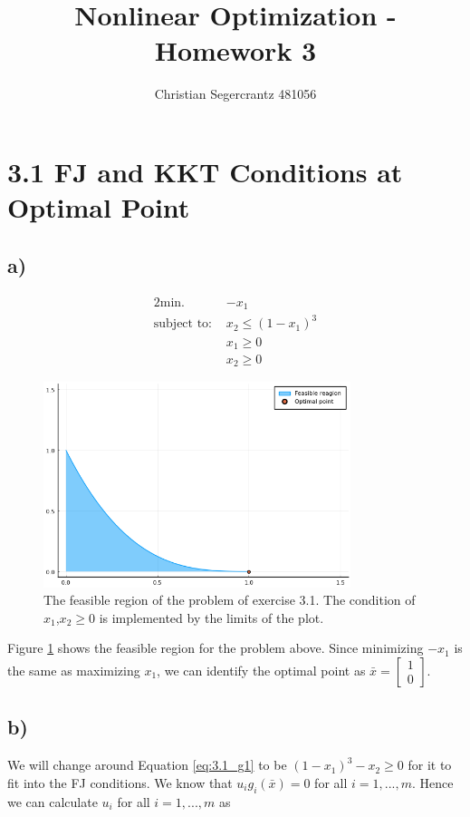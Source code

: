 \documentclass{article}
\title{Nonlinear Optimization - Homework 3}
\author{Christian Segercrantz 481056}
\begin{document}
\maketitle
\pagebreak
\section*{3.1 FJ and KKT Conditions at Optimal Point}
\subsection*{a)}
	\begin{alignat}{2}
		\text{min. } & -x_1 \\
		\text{subject to: } & x_2 \leq (1-x_1)^3 \label{eq:3.1_g1}\\
		&x_1 \geq 0 \\
		& x_2 \geq 0
	\end{alignat}
	\begin{figure}[H]
		\includegraphics[width=0.8\textwidth]{3_1.png}
		\caption{The feasible region of the problem of exercise 3.1. The condition of $x_1$,$x_2\geq 0$ is implemented by the limits of the plot.}
		\label{fig:1a}
	\end{figure}
	Figure \ref{fig:1a} shows the feasible region for the problem above. Since minimizing $-x_1$ is the same as maximizing $x_1$, we can identify the optimal point as $\bar{x} = \begin{bmatrix} 1 \\ 0 \end{bmatrix}$.
\subsection*{b)}
	We will change around Equation \ref{eq:3.1_g1} to be $(1-x_1)^3-x_2 \geq 0$ for it to fit into the FJ conditions. We know that $u_i g_i(\bar{x}) = 0$ for all $i= 1,...,m$. Hence we can calculate $u_i$ for all $i= 1,...,m$ as 
	
\end{document}
